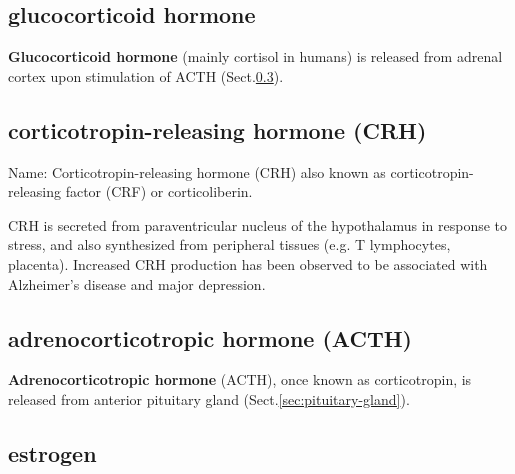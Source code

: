 \subsection{glucocorticoid hormone}
\label{sec:glucocorticoid-hormone}

{\bf Glucocorticoid hormone} (mainly cortisol in humans) is released from
adrenal cortex upon stimulation of ACTH (Sect.\ref{sec:ACTH}).

\subsection{corticotropin-releasing hormone (CRH)}
\label{sec:CRH}

Name: Corticotropin-releasing hormone (CRH) also known as
corticotropin-releasing factor (CRF) or corticoliberin.

CRH is secreted from paraventricular nucleus of the hypothalamus in response to
stress, and also synthesized from peripheral tissues (e.g. T lymphocytes,
placenta).
Increased CRH production has been observed to be associated with Alzheimer's
disease and major depression.



\subsection{ adrenocorticotropic hormone (ACTH)}
\label{sec:ACTH}

{\bf Adrenocorticotropic hormone} (ACTH), once known as corticotropin, is
released from anterior pituitary gland (Sect.\ref{sec:pituitary-gland}).
 
\subsection{estrogen}
\label{sec:estrogen}

